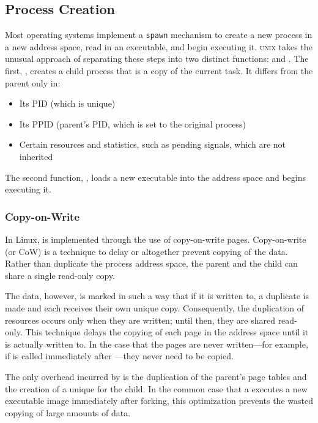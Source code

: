 \subsection{Process Creation}\label{subsec:Process_Creation}
Most operating systems implement a \texttt{spawn} mechanism to create a new process in a new address space, read in an executable, and begin executing it.
\textsc{unix} takes the unusual approach of separating these steps into two distinct functions:  and .
The first, , creates a child process that is a copy of the current task.
It differs from the parent only in:
\begin{itemize}[noitemsep]
\item Its PID (which is unique)
\item Its PPID (parent’s PID, which is set to the original process)
\item Certain resources and statistics, such as pending signals, which are not inherited
\end{itemize}

The second function, , loads a new executable into the address space and begins executing it.

\subsubsection{Copy-on-Write}\label{subsubsec:Process_Copy_on_Write}
In Linux,  is implemented through the use of copy-on-write pages.
Copy-on-write (or CoW) is a technique to delay or altogether prevent copying of the data.
Rather than duplicate the process address space, the parent and the child can share a single read-only copy.

The data, however, is marked in such a way that if it is written to, a duplicate is made and each  receives their own unique copy.
Consequently, the duplication of resources occurs only when they are written; until then, they are shared read-only.
This technique delays the copying of each page in the address space until it is actually written to.
In the case that the pages are never written—for example, if  is called immediately after —they never need to be copied.

The only overhead incurred by  is the duplication of the parent’s page tables and the creation of a unique  for the child.
In the common case that a  executes a new executable image immediately after forking, this optimization prevents the wasted copying of large amounts of data.

